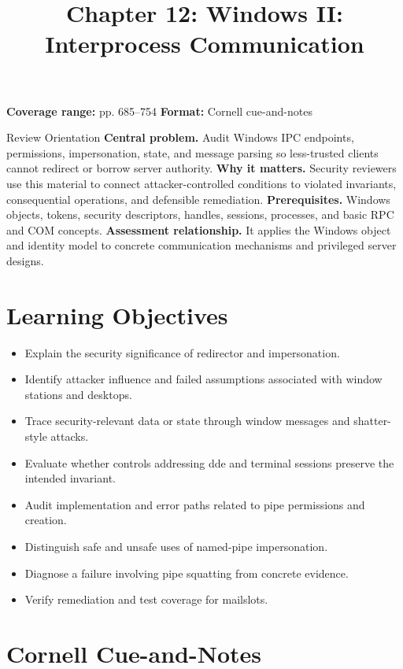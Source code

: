 \documentclass[11pt,letterpaper]{article}
\title{Chapter 12: Windows II: Interprocess Communication}
\author{}
\date{}
\begin{document}
\maketitle

\begin{center}
\small\color{Meta}\textbf{Coverage range:} pp. 685--754 \quad\textbullet\quad \textbf{Format:} Cornell cue-and-notes
\end{center}
\vspace{0.25em}
\begin{CornellOverviewBox}{Review Orientation}
\textbf{Central problem.} Audit Windows IPC endpoints, permissions, impersonation, state, and message parsing so less-trusted clients cannot redirect or borrow server authority.
\textbf{Why it matters.} Security reviewers use this material to connect attacker-controlled conditions to violated invariants, consequential operations, and defensible remediation.
\textbf{Prerequisites.} Windows objects, tokens, security descriptors, handles, sessions, processes, and basic RPC and COM concepts.
\textbf{Assessment relationship.} It applies the Windows object and identity model to concrete communication mechanisms and privileged server designs.
\end{CornellOverviewBox}
\section{Learning Objectives}
\begin{itemize}
\item Explain the security significance of redirector and impersonation.
\item Identify attacker influence and failed assumptions associated with window stations and desktops.
\item Trace security-relevant data or state through window messages and shatter-style attacks.
\item Evaluate whether controls addressing dde and terminal sessions preserve the intended invariant.
\item Audit implementation and error paths related to pipe permissions and creation.
\item Distinguish safe and unsafe uses of named-pipe impersonation.
\item Diagnose a failure involving pipe squatting from concrete evidence.
\item Verify remediation and test coverage for mailslots.
\end{itemize}
\section{Cornell Cue-and-Notes}
\end{document}
